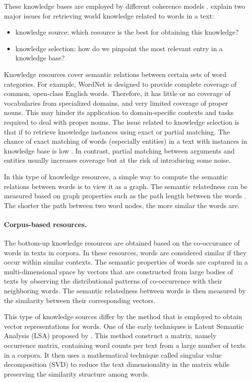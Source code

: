 These knowledge bases are employed by different coherence models \cite{lapata05a,zhangmuyu15}. 
 explain two major issues for retrieving world knowledge related to words in a text: 
\begin{itemize}
\item knowledge source: which resource is the best for obtaining this knowledge? 
\item knowledge selection: how do we pinpoint the most relevant entry in a knowledge base?
\end{itemize}
Knowledge resources cover semantic relations between certain sets of word categories.  
For example, WordNet is designed to provide complete coverage of common, open-class English words. 
Therefore, it has little or no coverage of vocabularies from specialized domains, and very limited coverage of proper nouns. 
This may hinder its application to domain-specific contexts and tasks required to deal with proper nouns. 
The issue related to knowledge selection is that if to retrieve knowledge instances using exact or partial matching. 
The chance of exact matching of words (especially entities) in a text with instances in knowledge base is low \cite{zhangmuyu15}. 
In contrast, partial matching between arguments and entities usually increases coverage but at the risk of introducing some noise. 

In this type of knowledge resources, a simple way to compute the semantic relations between words is to view it as a graph. 
The semantic relatedness can be measured based on graph properties such as the path length between the words \cite{budanitsky06}. 
The shorter the path between two word nodes, the more similar the words are. 

\paragraph{Corpus-based resources.} 
The bottom-up knowledge resources are obtained based on the co-occurance of words in texts in corpora. 
In these resources, words are considered similar if they occur within similar contexts. 
The semantic properties of words are captured in a multi-dimensional space by vectors that are constructed from large bodies of texts by observing the distributional patterns of co-occurrence with their neighboring words. 
The semantic relatedness between words is then measured by the similarity between their corresponding vectors. 

This type of knowledge sources differ by the method that is employed to obtain vector representations for words. 
One of the early techniques is Latent Semantic Analysis (LSA) proposed by . 
This method construct a matrix, namely occurrence matrix, containing word counts per text from a large number of texts in a corpora.  
It then uses a mathematical technique called singular value decomposition (SVD) \cite{} to reduce the text dimensionality in the matrix while preserving the similarity structure among words. 


